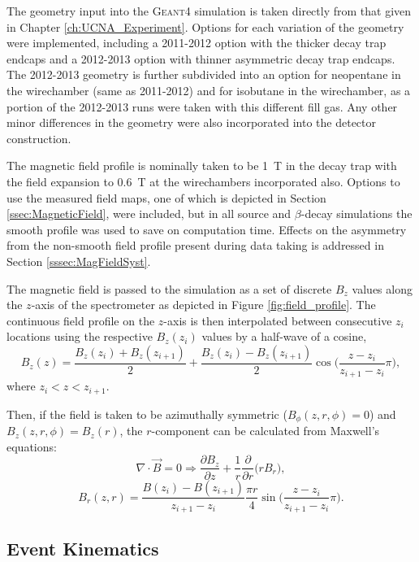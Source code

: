 The geometry input into the \textsc{Geant4} simulation is taken directly from
that given in Chapter \ref{ch:UCNA_Experiment}. Options for each variation
of the geometry were implemented, including a 2011-2012 option with
the thicker decay trap endcaps and a 2012-2013 option with thinner asymmetric
decay trap endcaps. The 2012-2013 geometry is further subdivided into an option
for neopentane in the wirechamber (same as 2011-2012) and for isobutane in the
wirechamber, as a portion of the 2012-2013 runs were taken with this
different fill gas. Any other minor differences in the geometry were also
incorporated into the detector construction.

The magnetic field profile is nominally taken to be 1~T in the decay trap
with the field expansion to 0.6~T at the wirechambers incorporated also.
Options to use the measured field maps, one of which is depicted in
Section \ref{ssec:MagneticField}, were included, but in all source
and $\beta$-decay simulations the smooth profile was used to save on
computation time. Effects on the asymmetry from the non-smooth
field profile present during data taking is addressed in
Section \ref{sssec:MagFieldSyst}.

The magnetic field is passed to the simulation as a set of discrete $B_z$
values along the $z$-axis of the spectrometer as depicted in Figure \ref{fig:field_profile}.
The continuous field profile on the $z$-axis is then interpolated between consecutive $z_i$ locations
using the respective $B_z(z_i)$ values by a half-wave of a cosine,
%
\begin{equation}
  B_z(z) = \frac{B_z(z_i) + B_z(z_{i+1})}{2} + \frac{B_z(z_i) - B_z(z_{i+1})}{2}\cos\bigg(\frac{z-z_i}{z_{i+1}-z_i}\pi\bigg),
\end{equation}
%
where $z_i<z<z_{i+1}$.

Then, if the field is taken to be azimuthally symmetric ($B_\phi(z,r,\phi)=0$) and $B_z(z,r,\phi)=B_z(r)$,
the $r$-component can be calculated from Maxwell's equations:
%
\begin{equation}
  \nabla \cdot \vec{B} = 0 \Rightarrow \frac{\partial B_z}{\partial z} + \frac{1}{r}\frac{\partial}{\partial r}\big(rB_r\big), 
\end{equation}
\begin{equation}
  B_r(z,r) =  \frac{B(z_i) - B(z_{i+1})}{z_{i+1}-z_i}\frac{\pi r}{4}\sin\bigg(\frac{z-z_i}{z_{i+1}-z_i}\pi\bigg).
\end{equation}
%


\subsection{Event Kinematics}

